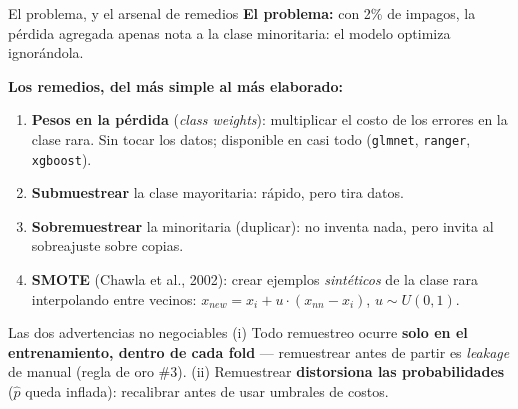 \documentclass{beamer}
\newcommand{\1}{\mathbb{I}}
\begin{document}
\begin{frame}{El problema, y el arsenal de remedios}
\small
\textbf{El problema:} con 2\% de impagos, la pérdida agregada apenas nota a la clase minoritaria: el modelo optimiza ignorándola.
\pause

\vspace{0.15cm}
\textbf{Los remedios, del más simple al más elaborado:}
\begin{enumerate}\itemsep4pt
  \item \textbf{Pesos en la pérdida} (\emph{class weights}): multiplicar el costo de los errores en la clase rara. Sin tocar los datos; disponible en casi todo (\texttt{glmnet}, \texttt{ranger}, \texttt{xgboost}). \pause
  \item \textbf{Submuestrear} la clase mayoritaria: rápido, pero tira datos.
  \item \textbf{Sobremuestrear} la minoritaria (duplicar): no inventa nada, pero invita al sobreajuste sobre copias. \pause
  \item \textbf{SMOTE} (Chawla et al., 2002): crear ejemplos \emph{sintéticos} de la clase rara interpolando entre vecinos: $x_{new} = x_i + u \cdot (x_{nn} - x_i)$, $u \sim U(0,1)$.
\end{enumerate}
\pause

\vspace{0.1cm}
\begin{block}{Las dos advertencias no negociables}
(i) Todo remuestreo ocurre \textbf{solo en el entrenamiento, dentro de cada fold} --- remuestrear antes de partir es \emph{leakage} de manual (regla de oro \#3). (ii) Remuestrear \textbf{distorsiona las probabilidades} ($\hat{p}$ queda inflada): recalibrar antes de usar umbrales de costos.
\end{block}
\end{frame}
\end{document}
